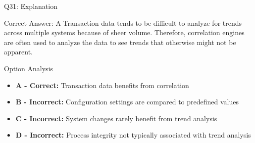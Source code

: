 \documentclass{beamer}
\begin{document}
	\begin{frame}{Q31: Explanation}
		\begin{block}{Correct Answer: A}
			Transaction data tends to be difficult to analyze for trends across multiple systems because of sheer volume. Therefore, correlation engines are often used to analyze the data to see trends that otherwise might not be apparent.
		\end{block}
		\begin{block}{Option Analysis}
			\begin{itemize}
				\item \textbf{A - Correct:} Transaction data benefits from correlation
				\item \textbf{B - Incorrect:} Configuration settings are compared to predefined values
				\item \textbf{C - Incorrect:} System changes rarely benefit from trend analysis
				\item \textbf{D - Incorrect:} Process integrity not typically associated with trend analysis
			\end{itemize}
		\end{block}
	\end{frame}
	
\end{document}
